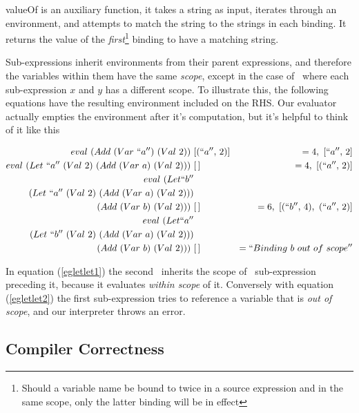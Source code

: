 \documentclass {article}
\begin{document}
valueOf is an auxiliary function,
it takes a string as input, iterates through an
environment, and attempts to match
the string to the strings in each binding.
It returns the value of the \emph{first}\footnote{
Should a variable name be bound to twice in a 
source expression and in the same scope,
only the latter binding will
be in effect} binding
to have a matching string. 
\linebreak

Sub-expressions inherit environments from their parent expressions,
and therefore the variables within them have the same \emph{scope},
except in the case of \ where each sub-expression $x$ and $y$
has a different scope. 
To illustrate this, the following equations
have the resulting environment included on the RHS.
Our evaluator actually empties the environment 
after it's computation, 
but it's helpful to think of it like this

\begin{align}
eval\ (Add\ (Var\ ``a'')\ (Val\ 2))\ &[(``a'',\, 2)] 
			&= 4,\ [``a'',\, 2] \nonumber \\
eval\ (Let\ ``a''\ (Val\ 2)\ (Add\ (Var\ a)\ (Val\ 2))  )\ &[\, ] 
		&= 4,\ [(``a'',\, 2)] \nonumber \\ 
eval\ (Let ``b'' \nonumber \\
		(Let\ ``a''\ (Val\ 2) \
			 (Add\ (Var\ a)\ (Val\ 2))  ) \nonumber \\
		(Add\ (Var\ b)\ (Val\ 2)))\ &[\, ] 
		&= 6,\ [(``b'',\, 4),\ (``a'',\, 2)] \label{egletlet1} \\ 
eval\ (Let ``a'' \nonumber \\
		(Let\ ``b''\ (Val\ 2) \
			 (Add\ (Var\ a)\ (Val\ 2))  ) \nonumber \\
		(Add\ (Var\ b)\ (Val\ 2)))\ &[\, ] 
		&= ``Binding\ b\ out\ of\ scope'' \label{egletlet2} \nonumber \\
\end{align}

In equation (\ref{egletlet1})
the second \add\ inherits
the scope of \ sub-expression 
preceding it, 
because it evaluates
\emph{within scope} of it.
Conversely with equation (\ref{egletlet2})
the first sub-expression tries to reference
a variable that is \emph{out of scope},
and our interpreter throws an error.



\subsection{Compiler Correctness}
\end{document}
